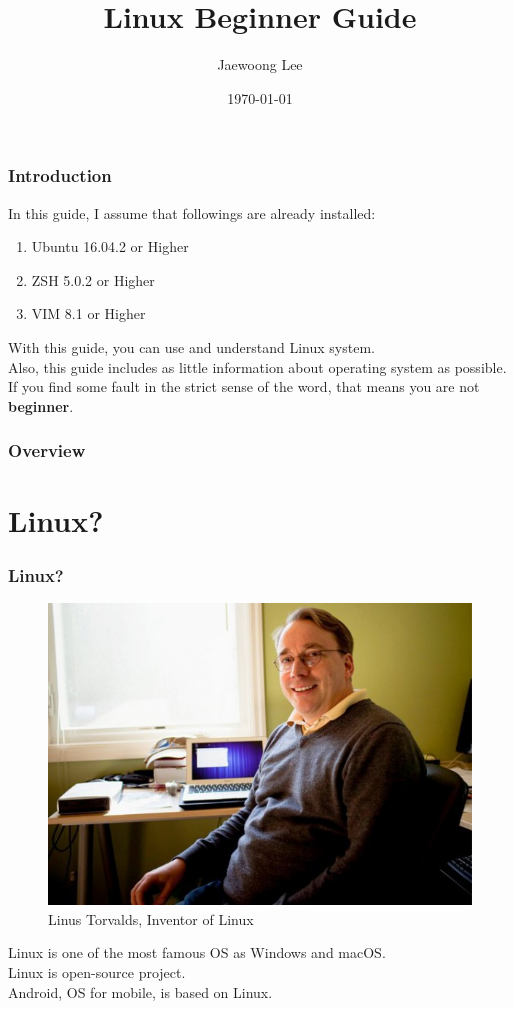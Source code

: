 \documentclass{beamer}
\title{Linux Beginner Guide}
\author{Jaewoong Lee}
\institute[UNIST]
{
	Ulsan National Institute of Science and Technology
	\medskip
	\newline
	\textit{jwlee230@unist.ac.kr}
}
\date{\today}
\begin{document}
	\begin{frame}
		\titlepage
	\end{frame}

	\begin{frame}
		\frametitle{Introduction}
		
		In this guide, I assume that followings are already installed:
		\begin{enumerate}
			\item Ubuntu 16.04.2 or Higher
			\item ZSH 5.0.2 or Higher
			\item VIM 8.1 or Higher
		\end{enumerate}

		With this guide, you can use and understand Linux system. \\
		Also, this guide includes as little information about operating system as possible. If you find some fault in the strict sense of the word, that means you are not \textbf{beginner}. 
	\end{frame}

	\begin{frame}
		\frametitle{Overview}
		\tableofcontents
	\end{frame}

	\section{Linux?}
	
	\begin{frame}
		\frametitle{Linux?}
		\begin{figure}[h!]
			\centering
			\includegraphics[width=0.4 \linewidth]{figures/linus.jpg}
			\caption{Linus Torvalds, Inventor of Linux}
		\end{figure}
	
		Linux is one of the most famous OS as Windows and macOS. \\
		Linux is open-source project. \\
		Android, OS for mobile, is based on Linux. 
	\end{frame}
\end{document}
